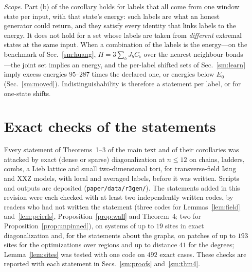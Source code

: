 \documentclass[aps,prx,onecolumn,10pt,nofootinbib,longbibliography,floatfix]{revtex4-2}
\theoremstyle{remark}
\begin{document}
\emph{Scope.} Part (b) of the corollary holds for labels that all come from one window state per
input, with that state's energy: such labels are what an honest generator could return, and they satisfy every
identity that links labels to the energy. It does not hold for a set whose labels are taken from \emph{different}
extremal states at the same input. When a combination of the labels is the energy---on the benchmark of
Sec.~\ref{sm:huang}, $H=3\sum_bJ_bC_b$ over the nearest-neighbour bonds---the joint set implies an energy, and the
per-label shifted sets of Sec.~\ref{sm:learn} imply excess energies $95$--$287$ times the declared one, or energies %
below $E_0$ (Sec.~\ref{sm:moved}). Indistinguishability is therefore a statement per label, or for one-state shifts.

\section{Exact checks of the statements}
\label{sm:checks}

Every statement of Theorems~1--3 of the main text and of their corollaries was attacked by exact (dense or sparse) %
diagonalization at $n\le12$ on %
chains, ladders, combs, a Lieb lattice and small two-dimensional tori, for transverse-field Ising and XXZ models, with
local and averaged labels, before it was written. Scripts and outputs are deposited
(\texttt{paper/data/r3gen/}). The statements added in this revision were each checked with at least two %
independently written codes, by readers who had not written the statement (three codes for
Lemmas~\ref{lem:field} and~\ref{lem:peierls}, Proposition~\ref{prop:wall} and Theorem~4; two for %
Proposition~\ref{prop:unpinned}), on systems of up to $19$ sites in exact diagonalization and, for the statements
about the graphs, on patches of up to $193$ sites for the optimizations over regions and up to distance $41$ for the %
degrees; Lemma~\ref{lem:sites} was tested with one code on $492$ exact cases. These checks are reported with each %
statement in Secs.~\ref{sm:proofs} and~\ref{sm:thm4}.
\end{document}
